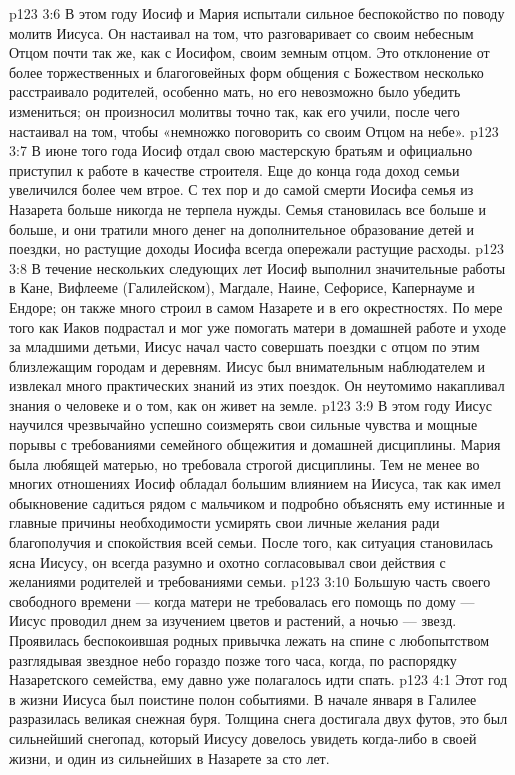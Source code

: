 \vs p123 3:6 \pc В этом году Иосиф и Мария испытали сильное беспокойство по поводу молитв Иисуса. Он настаивал на том, что разговаривает со своим небесным Отцом почти так же, как с Иосифом, своим земным отцом. Это отклонение от более торжественных и благоговейных форм общения с Божеством несколько расстраивало родителей, особенно мать, но его невозможно было убедить измениться; он произносил молитвы точно так, как его учили, после чего настаивал на том, чтобы «немножко поговорить со своим Отцом на небе».
\vs p123 3:7 В июне того года Иосиф отдал свою мастерскую братьям и официально приступил к работе в качестве строителя. Еще до конца года доход семьи увеличился более чем втрое. С тех пор и до самой смерти Иосифа семья из Назарета больше никогда не терпела нужды. Семья становилась все больше и больше, и они тратили много денег на дополнительное образование детей и поездки, но растущие доходы Иосифа всегда опережали растущие расходы.
\vs p123 3:8 В течение нескольких следующих лет Иосиф выполнил значительные работы в Кане, Вифлееме (Галилейском), Магдале, Наине, Сефорисе, Капернауме и Ендоре; он также много строил в самом Назарете и в его окрестностях. По мере того как Иаков подрастал и мог уже помогать матери в домашней работе и уходе за младшими детьми, Иисус начал часто совершать поездки с отцом по этим близлежащим городам и деревням. Иисус был внимательным наблюдателем и извлекал много практических знаний из этих поездок. Он неутомимо накапливал знания о человеке и о том, как он живет на земле.
\vs p123 3:9 \pc В этом году Иисус научился чрезвычайно успешно соизмерять свои сильные чувства и мощные порывы с требованиями семейного общежития и домашней дисциплины. Мария была любящей матерью, но требовала строгой дисциплины. Тем не менее во многих отношениях Иосиф обладал большим влиянием на Иисуса, так как имел обыкновение садиться рядом с мальчиком и подробно объяснять ему истинные и главные причины необходимости усмирять свои личные желания ради благополучия и спокойствия всей семьи. После того, как ситуация становилась ясна Иисусу, он всегда разумно и охотно согласовывал свои действия с желаниями родителей и требованиями семьи.
\vs p123 3:10 \pc Большую часть своего свободного времени --- когда матери не требовалась его помощь по дому --- Иисус проводил днем за изучением цветов и растений, а ночью --- звезд. Проявилась беспокоившая родных привычка лежать на спине с любопытством разглядывая звездное небо гораздо позже того часа, когда, по распорядку Назаретского семейства, ему давно уже полагалось идти спать.
\vs p123 4:1 Этот год в жизни Иисуса был поистине полон событиями. В начале января в Галилее разразилась великая снежная буря. Толщина снега достигала двух футов, это был сильнейший снегопад, который Иисусу довелось увидеть когда\hyp{}либо в своей жизни, и один из сильнейших в Назарете за сто лет.
